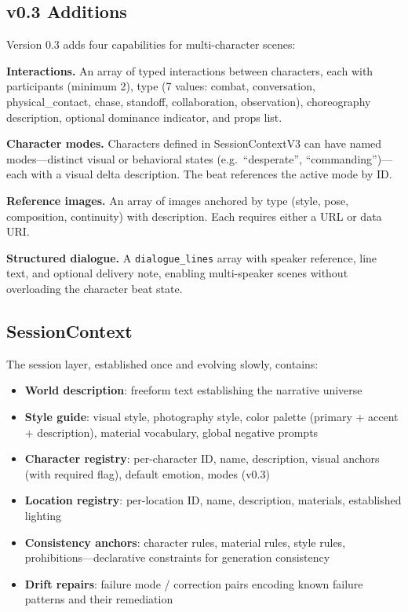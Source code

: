 \documentclass{article}
\begin{document}
\subsection{v0.3 Additions}

Version 0.3 adds four capabilities for multi-character scenes:

\textbf{Interactions.} An array of typed interactions between characters, each with participants (minimum 2), type (7 values: combat, conversation, physical\_contact, chase, standoff, collaboration, observation), choreography description, optional dominance indicator, and props list.

\textbf{Character modes.} Characters defined in SessionContextV3 can have named modes---distinct visual or behavioral states (e.g.\ ``desperate'', ``commanding'')---each with a visual delta description. The beat references the active mode by ID.

\textbf{Reference images.} An array of images anchored by type (style, pose, composition, continuity) with description. Each requires either a URL or data URI.

\textbf{Structured dialogue.} A \texttt{dialogue\_lines} array with speaker reference, line text, and optional delivery note, enabling multi-speaker scenes without overloading the character beat state.

\subsection{SessionContext}

The session layer, established once and evolving slowly, contains:

\begin{itemize}\tightlist
  \item \textbf{World description}: freeform text establishing the narrative universe
  \item \textbf{Style guide}: visual style, photography style, color palette (primary + accent + description), material vocabulary, global negative prompts
  \item \textbf{Character registry}: per-character ID, name, description, visual anchors (with required flag), default emotion, modes (v0.3)
  \item \textbf{Location registry}: per-location ID, name, description, materials, established lighting
  \item \textbf{Consistency anchors}: character rules, material rules, style rules, prohibitions---declarative constraints for generation consistency
  \item \textbf{Drift repairs}: failure mode / correction pairs encoding known failure patterns and their remediation
\end{itemize}
\end{document}
